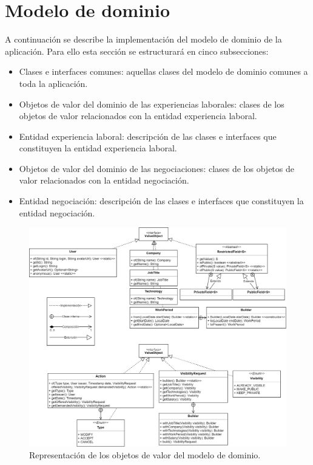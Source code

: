 \documentclass[a4paper, 12pt]{book}
\begin{document}
    \section{Modelo de dominio}
    \label{sec:domain_model_impl}
    A continuación se describe la implementación del modelo de dominio de la aplicación. Para ello esta sección se estructurará en cinco subsecciones:

    \begin{itemize}
        \item Clases e interfaces comunes: aquellas clases del modelo de dominio comunes a toda la aplicación.
        \item Objetos de valor del dominio de las experiencias laborales: clases de los objetos de valor relacionados con la entidad experiencia laboral.
        \item Entidad experiencia laboral: descripción de las clases e interfaces que constituyen la entidad experiencia laboral.
        \item Objetos de valor del dominio de las negociaciones: clases de los objetos de valor relacionados con la entidad negociación.
        \item Entidad negociación: descripción de las clases e interfaces que constituyen la entidad negociación.
    \end{itemize}

    \begin{figure}
        \centering
        \includegraphics[width=15cm, keepaspectratio]{img/Modelo_dominio_vo.png}
        \caption{Representación de los objetos de valor del modelo de dominio.}\label{fig:domain_model_vo}
    \end{figure}
\end{document}
